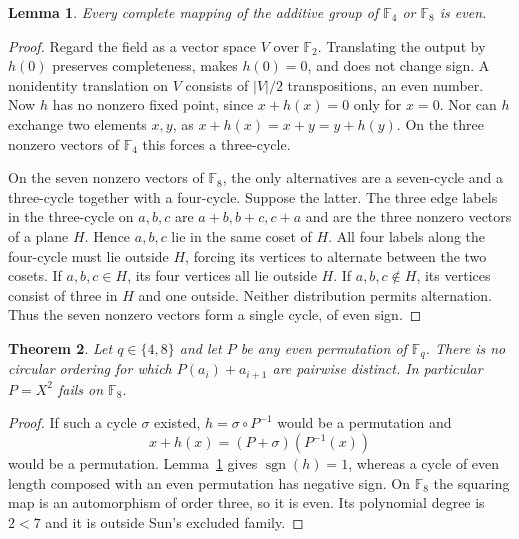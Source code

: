 \documentclass[10pt]{article}
\newtheorem{theorem}{Theorem}
\newtheorem{lemma}[theorem]{Lemma}
\newcommand{\F}{\mathbb F}
\begin{document}
\begin{lemma}\label{lem:even}
Every complete mapping of the additive group of $\F_4$ or $\F_8$ is even.
\end{lemma}
\begin{proof}
Regard the field as a vector space $V$ over $\F_2$. Translating the output by $h(0)$ preserves completeness, makes $h(0)=0$, and does not change sign. A nonidentity translation on $V$ consists of $|V|/2$ transpositions, an even number. Now $h$ has no nonzero fixed point, since $x+h(x)=0$ only for $x=0$. Nor can $h$ exchange two elements $x,y$, as $x+h(x)=x+y=y+h(y)$. On the three nonzero vectors of $\F_4$ this forces a three-cycle.

On the seven nonzero vectors of $\F_8$, the only alternatives are a seven-cycle and a three-cycle together with a four-cycle. Suppose the latter. The three edge labels in the three-cycle on $a,b,c$ are $a+b,b+c,c+a$ and are the three nonzero vectors of a plane $H$. Hence $a,b,c$ lie in the same coset of $H$. All four labels along the four-cycle must lie outside $H$, forcing its vertices to alternate between the two cosets. If $a,b,c\in H$, its four vertices all lie outside $H$. If $a,b,c\notin H$, its vertices consist of three in $H$ and one outside. Neither distribution permits alternation. Thus the seven nonzero vectors form a single cycle, of even sign.
\end{proof}

\begin{theorem}\label{th:reject}
Let $q\in\{4,8\}$ and let $P$ be any even permutation of $\F_q$. There is no circular ordering for which $P(a_i)+a_{i+1}$ are pairwise distinct. In particular $P=X^2$ fails on $\F_8$.
\end{theorem}
\begin{proof}
If such a cycle $\sigma$ existed, $h=\sigma\circ P^{-1}$ would be a permutation and
\[
 x+h(x)=(P+\sigma)(P^{-1}(x))
\]
would be a permutation. Lemma~\ref{lem:even} gives $\operatorname{sgn}(h)=1$, whereas a cycle of even length composed with an even permutation has negative sign. On $\F_8$ the squaring map is an automorphism of order three, so it is even. Its polynomial degree is $2<7$ and it is outside Sun's excluded family.
\end{proof}
\end{document}
